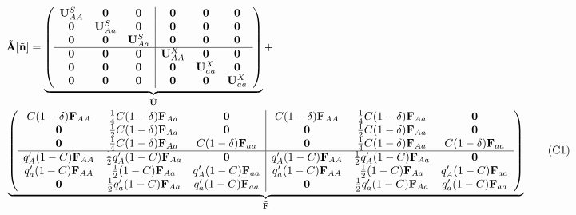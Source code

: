 \documentclass[11pt,draft]{article}
\newcommand\numberthis{\addtocounter{equation}{1}\tag{\theequation}}
\def\mbf#1{\mathbf{#1}}
\begin{document}
{
\small

\begin{align*} \label{eq:AtildeFull}
	&\tilde{\mbf{A}}[\tilde{\mbf{n}}] = 
		 \underbrace{\left(
			\begin{array}{ccc|ccc}
				\mbf{U}^S_{AA} & \mbf{0} & \mbf{0} & \mbf{0} & \mbf{0} & \mbf{0} \\ 
				\mbf{0} & \mbf{U}^S_{Aa} & \mbf{0} & \mbf{0} & \mbf{0} & \mbf{0} \\
				\mbf{0} & \mbf{0} & \mbf{U}^S_{Aa} & \mbf{0} & \mbf{0} & \mbf{0} \\ \hline
				\mbf{0} & \mbf{0} & \mbf{0} & \mbf{U}^X_{AA} & \mbf{0} & \mbf{0} \\
				\mbf{0} & \mbf{0} & \mbf{0} & \mbf{0} & \mbf{U}^X_{aa} & \mbf{0}\\
				\mbf{0} & \mbf{0} & \mbf{0} & \mbf{0} & \mbf{0} & \mbf{U}^X_{aa}
			\end{array} \right)}_{\tilde{\mbf{U}}} + \\ 
	&\underbrace{\left(
			\begin{array}{ccc|ccc}
				C (1 - \delta) \mbf{F}_{AA} & \frac{1}{4} C (1 - \delta) \mbf{F}_{Aa} & \mbf{0} & C (1 - \delta) \mbf{F}_{AA} & \frac{1}{4} C (1 - \delta) \mbf{F}_{Aa} & \mbf{0} \\ 
				\mbf{0} & \frac{1}{2} C (1 - \delta) \mbf{F}_{Aa} & \mbf{0} & \mbf{0} & \frac{1}{2} C (1 - \delta) \mbf{F}_{Aa} & \mbf{0}  \\
				\mbf{0} & \frac{1}{4} C (1 - \delta) \mbf{F}_{Aa} & C (1 - \delta) \mbf{F}_{aa} & \mbf{0} & \frac{1}{4} C (1 - \delta) \mbf{F}_{Aa} & C (1 - \delta) \mbf{F}_{aa} \\ \hline
				q^{\prime}_{A} (1 - C)\mbf{F}_{AA} & \frac{1}{2} q^{\prime}_{A} (1 - C)\mbf{F}_{Aa}  & \mbf{0} & q^{\prime}_{A} (1 - C) \mbf{F}_{AA}& \frac{1}{2} q^{\prime}_{A} (1 - C) \mbf{F}_{Aa} & \mbf{0} \\
				q^{\prime}_{a} (1 - C) \mbf{F}_{AA} & \frac{1}{2} (1 - C)\mbf{F}_{Aa}  & q^{\prime}_{A} (1 - C)\mbf{F}_{aa}  & q^{\prime}_{a} (1 - C) \mbf{F}_{AA} & \frac{1}{2}(1 - C) \mbf{F}_{Aa}  & q^{\prime}_{A} (1 - C)\mbf{F}_{aa}  \\
				\mbf{0} & \frac{1}{2} q^{\prime}_{a} (1 - C)\mbf{F}_{Aa} & q^{\prime}_{a} (1 - C) \mbf{F}_{aa} & \mbf{0} & \frac{1}{2} q^{\prime}_{a} (1 - C)\mbf{F}_{Aa} & q^{\prime}_{a} (1 - C)\mbf{F}_{aa} 
			\end{array} \right)}_{\tilde{\mbf{F}}} \numberthis
\end{align*}

}
\end{document}

